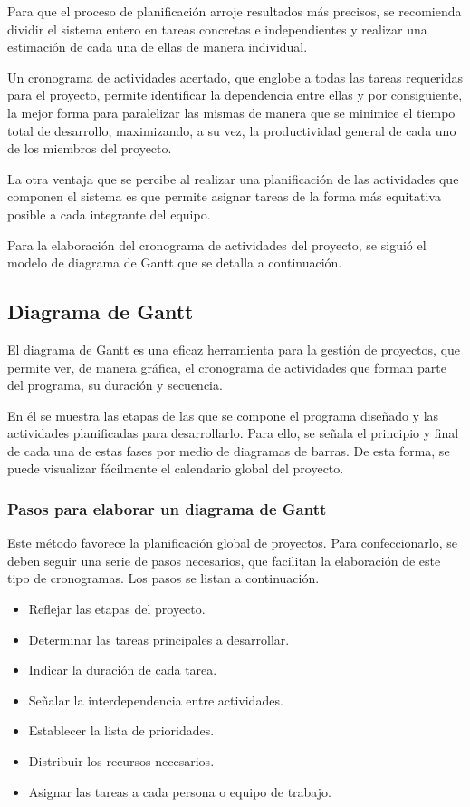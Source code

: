 Para que el proceso de planificación arroje resultados más precisos, se recomienda dividir el sistema entero en tareas concretas e independientes y realizar una estimación de cada una de ellas de manera individual.

Un cronograma de actividades acertado, que englobe a todas las tareas requeridas para el proyecto, permite identificar la dependencia entre ellas y por consiguiente, la mejor forma para paralelizar las mismas de manera que se minimice el tiempo total de desarrollo, maximizando, a su vez, la productividad general de cada uno de los miembros del proyecto.

La otra ventaja que se percibe al realizar una planificación de las actividades que componen el sistema es que permite asignar tareas de la forma más equitativa posible a cada integrante del equipo.

Para la elaboración del cronograma de actividades del proyecto, se siguió el modelo de diagrama de Gantt que se detalla a continuación.

\subsection{Diagrama de Gantt}
El diagrama de Gantt es una eficaz herramienta para la gestión de proyectos, que permite ver, de manera gráfica, el cronograma de actividades que forman parte del programa, su duración y secuencia.

En él se muestra las etapas de las que se compone el programa diseñado y las actividades planificadas para desarrollarlo. Para ello, se señala el principio y final de cada una de estas fases por medio de diagramas de barras. De esta forma, se puede visualizar  fácilmente  el calendario global del proyecto.

\subsubsection{Pasos para elaborar un diagrama de Gantt}
Este método favorece la planificación global de proyectos. Para confeccionarlo, se deben seguir una serie de pasos necesarios, que facilitan la elaboración de este tipo de cronogramas. Los pasos se listan a continuación.

\begin{itemize}
	\item Reflejar las etapas del proyecto.
	\item Determinar las tareas principales a desarrollar.
	\item Indicar la duración de cada tarea.
	\item Señalar la interdependencia entre actividades.
	\item Establecer la lista de prioridades.
	\item Distribuir los recursos necesarios.
	\item Asignar las tareas a cada persona o equipo de trabajo.
\end{itemize}

